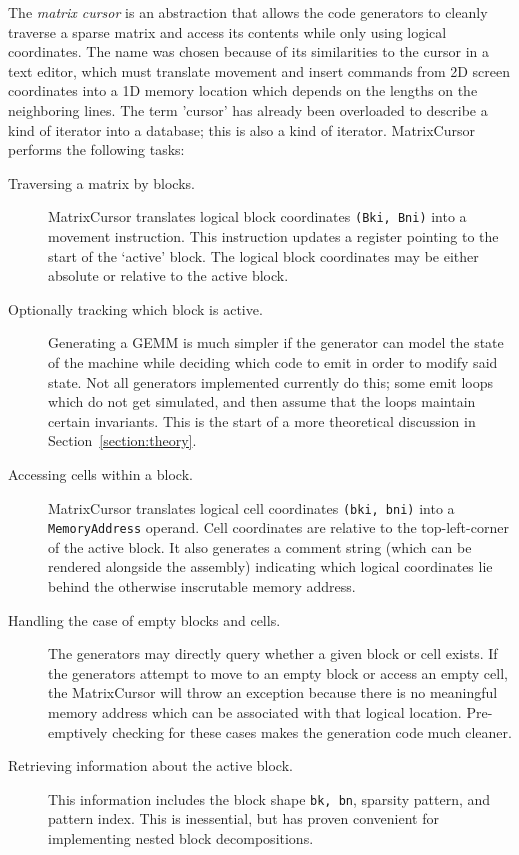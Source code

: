     The \emph{matrix cursor} is an abstraction that allows the code generators to cleanly traverse a sparse matrix and access its contents while only using logical coordinates. The name was chosen because of its similarities to the cursor in a text editor, which must translate movement and insert commands from 2D screen coordinates into a 1D memory location which depends on the lengths on the neighboring lines. The term 'cursor' has already been overloaded to describe a kind of iterator into a database; this is also a kind of iterator. MatrixCursor performs the following tasks:

    \begin{description}

    \item[Traversing a matrix by blocks.] MatrixCursor translates logical block coordinates \texttt{(Bki, Bni)} into a movement instruction. This instruction updates a register pointing to the start of the `active' block. The logical block coordinates may be either absolute or relative to the active block.

    \item[Optionally tracking which block is active.] Generating a GEMM is much simpler if the generator can model the state of the machine while deciding which code to emit in order to modify said state. Not all generators implemented currently do this; some emit loops which do not get simulated, and then assume that the loops maintain certain invariants. This is the start of a more theoretical discussion in Section~\ref{section:theory}. 

    \item[Accessing cells within a block.] MatrixCursor translates logical cell coordinates \texttt{(bki, bni)} into a \texttt{MemoryAddress} operand. Cell coordinates are relative to the top-left-corner of the active block. It also generates a comment string (which can be rendered alongside the assembly) indicating which logical coordinates lie behind the otherwise inscrutable memory address.

    \item[Handling the case of empty blocks and cells.] The generators may directly query whether a given block or cell exists. If the generators attempt to move to an empty block or access an empty cell, the MatrixCursor will throw an exception because there is no meaningful memory address which can be associated with that logical location. Pre-emptively checking for these cases makes the generation code much cleaner.

    \item[Retrieving information about the active block.] This information includes the block shape \texttt{bk, bn}, sparsity pattern, and pattern index. This is inessential, but has proven convenient for implementing nested block decompositions.

    \end{description}

